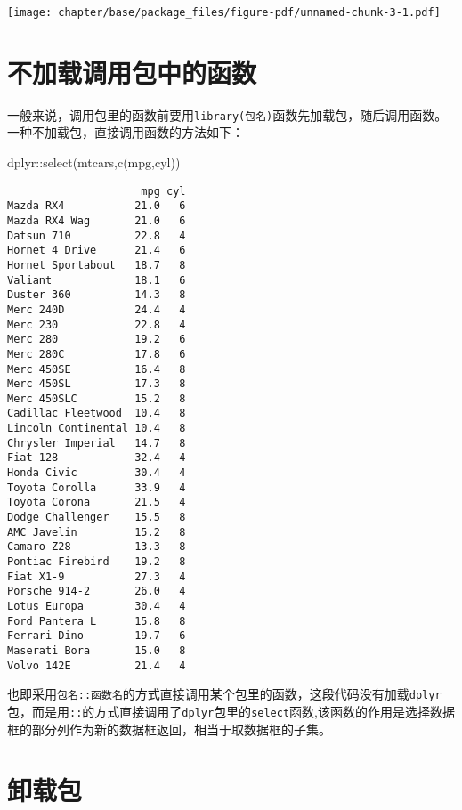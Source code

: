 \documentclass[
  letterpaper,
  DIV=11,
  numbers=noendperiod]{scrreprt}
\newenvironment{Shaded}{\begin{snugshade}}{\end{snugshade}}
\newcommand{\FunctionTok}[1]{\textcolor[rgb]{0.28,0.35,0.67}{#1}}
\newcommand{\NormalTok}[1]{\textcolor[rgb]{0.00,0.23,0.31}{#1}}
\newcommand{\SpecialCharTok}[1]{\textcolor[rgb]{0.37,0.37,0.37}{#1}}
\newcommand{\StringTok}[1]{\textcolor[rgb]{0.13,0.47,0.30}{#1}}
\begin{document}
\texttt{[image: chapter/base/package\_files/figure-pdf/unnamed-chunk-3-1.pdf]}

\section{不加载调用包中的函数}\label{ux4e0dux52a0ux8f7dux8c03ux7528ux5305ux4e2dux7684ux51fdux6570}

一般来说，调用包里的函数前要用\texttt{library(包名)}函数先加载包，随后调用函数。
一种不加载包，直接调用函数的方法如下：

\begin{Shaded}
\begin{Highlighting}[]
\NormalTok{dplyr}\SpecialCharTok{::}\FunctionTok{select}\NormalTok{(mtcars,}\FunctionTok{c}\NormalTok{(}\StringTok{\textquotesingle{}mpg\textquotesingle{}}\NormalTok{,}\StringTok{\textquotesingle{}cyl\textquotesingle{}}\NormalTok{))}
\end{Highlighting}
\end{Shaded}

\begin{verbatim}
                     mpg cyl
Mazda RX4           21.0   6
Mazda RX4 Wag       21.0   6
Datsun 710          22.8   4
Hornet 4 Drive      21.4   6
Hornet Sportabout   18.7   8
Valiant             18.1   6
Duster 360          14.3   8
Merc 240D           24.4   4
Merc 230            22.8   4
Merc 280            19.2   6
Merc 280C           17.8   6
Merc 450SE          16.4   8
Merc 450SL          17.3   8
Merc 450SLC         15.2   8
Cadillac Fleetwood  10.4   8
Lincoln Continental 10.4   8
Chrysler Imperial   14.7   8
Fiat 128            32.4   4
Honda Civic         30.4   4
Toyota Corolla      33.9   4
Toyota Corona       21.5   4
Dodge Challenger    15.5   8
AMC Javelin         15.2   8
Camaro Z28          13.3   8
Pontiac Firebird    19.2   8
Fiat X1-9           27.3   4
Porsche 914-2       26.0   4
Lotus Europa        30.4   4
Ford Pantera L      15.8   8
Ferrari Dino        19.7   6
Maserati Bora       15.0   8
Volvo 142E          21.4   4
\end{verbatim}

也即采用\texttt{包名::函数名}的方式直接调用某个包里的函数，这段代码没有加载\texttt{dplyr}包，而是用\texttt{::}的方式直接调用了\texttt{dplyr}包里的\texttt{select}函数,该函数的作用是选择数据框的部分列作为新的数据框返回，相当于取数据框的子集。

\section{卸载包}\label{ux5378ux8f7dux5305}
\end{document}
